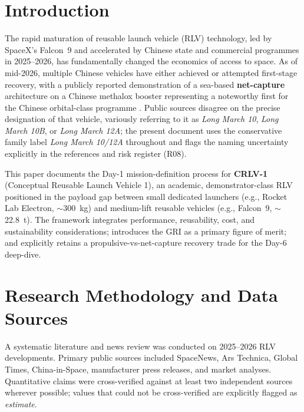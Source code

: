 \documentclass[10pt,a4paper]{article}
\begin{document}
\tableofcontents
\vspace{1em}

\section{Introduction}
The rapid maturation of reusable launch vehicle (RLV) technology, led by SpaceX's Falcon~9 and accelerated by Chinese state and commercial programmes in 2025--2026, has fundamentally changed the economics of access to space. As of mid-2026, multiple Chinese vehicles have either achieved or attempted first-stage recovery, with a publicly reported demonstration of a sea-based \textbf{net-capture} architecture on a Chinese methalox booster representing a noteworthy first for the Chinese orbital-class programme \cite{arstechnica2026}. Public sources disagree on the precise designation of that vehicle, variously referring to it as \textit{Long March 10}, \textit{Long March 10B}, or \textit{Long March 12A}; the present document uses the conservative family label \textit{Long March 10/12A} throughout and flags the naming uncertainty explicitly in the references and risk register (R08).

This paper documents the Day-1 mission-definition process for \textbf{CRLV-1} (Conceptual Reusable Launch Vehicle 1), an academic, demonstrator-class RLV positioned in the payload gap between small dedicated launchers (e.g., Rocket Lab Electron, $\sim$300~kg) and medium-lift reusable vehicles (e.g., Falcon~9, $\sim$22.8~t). The framework integrates performance, reusability, cost, and sustainability considerations; introduces the GRI as a primary figure of merit; and explicitly retains a propulsive-vs-net-capture recovery trade for the Day-6 deep-dive.

\section{Research Methodology and Data Sources}
A systematic literature and news review was conducted on 2025--2026 RLV developments. Primary public sources included SpaceNews, Ars Technica, Global Times, China-in-Space, manufacturer press releases, and market analyses. Quantitative claims were cross-verified against at least two independent sources wherever possible; values that could not be cross-verified are explicitly flagged as \textit{estimate}.
\end{document}
